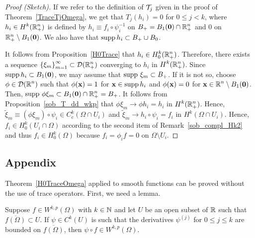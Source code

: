 \begin{proof}[Proof (Sketch)]
If we refer to the definition of $\mathcal{T}_j$ given in the proof of
Theorem~\ref{TraceTjOmega}, we get that
$\displaystyle T_j(h_i) = 0$ for $0 \leq j <k$, where
$\displaystyle h_i \in H^k(\mathbb{R}^n_+)$ is defined by
$h_i \equiv f_i \circ \psi_i^{-1}$ on
$\displaystyle B_+ = B_1(\mathbf{0}) \cap \mathbb{R}^n_+$
and $0$ on $\displaystyle \mathbb{R}^n_+ \setminus B_1(\mathbf{0})$.  We also have that
$\operatorname{supp} h_i \subset B_+ \cup B_0$.

It follows from Proposition~\ref{H0Trace} that
$\displaystyle h_i \in H^k_0(\mathbb{R}^n_+)$.
Therefore, there exists a sequence
$\displaystyle \left\{\xi_m\right\}_{m=1}^\infty \subset \mathcal{D}(\mathbb{R}^n_+)$
converging to $h_i$ in $\displaystyle H^k(\mathbb{R}^n_+)$.  Since
$\operatorname{supp} h_i \subset B_1(\mathbf{0})$, we may assume that
$\operatorname{supp}\, \xi_m \subset B_+$.  If it is not
so, choose $\displaystyle \phi \in \mathcal{D}(\mathbb{R}^n)$ such that
$\phi(\mathbf{x}) = 1$ for $\mathbf{x} \in \operatorname{supp} h_i$ and $\phi(\mathbf{x}) = 0$ for
$\displaystyle \mathbf{x} \in \mathbb{R}^n \setminus B_1(\mathbf{0})$.
Then,
$\displaystyle \operatorname{supp}\, \phi \xi_m \subset B_1(\mathbf{0}) \cap \mathbb{R}^n_+ = B_+$.
It follows from Proposition~\ref{sob_T_dd_wkp} that
$\phi \xi_m \to \phi h_i = h_i$ in $\displaystyle H^k(\mathbb{R}^n_+)$.
Hence, $\displaystyle \tilde{\xi}_m \equiv (\phi \xi_m) \circ
\psi_i \in C_c^k(\Omega \cap U_i)$
and $\tilde{\xi}_m \to h_i \circ \psi_i = f_i$
in $\displaystyle H^k(\Omega \cap U_i)$.
Hence, $\displaystyle f_i \in H^k_0(U_i \cap \Omega)$
according to the second item of Remark~\ref{sob_compl_Hk2}
and thus $\displaystyle f_i \in H^k_0(\Omega)$ because $f_i = \phi_i f = 0$ on
$\Omega \setminus U_i$.
\end{proof}

\subsection{Appendix}

Theorem~\ref{H0TraceOmega} applied to smooth functions can be proved
without the use of trace operators.  First, we need a lemma.

\begin{lemma} \label{sob_comp_DF}
Suppose $\displaystyle f \in W^{k,p}(\Omega)$ with $k\in \mathbb{N}$ and let
$U$ be an open subset of $\mathbb{R}$ such that
$\displaystyle \overline{ f(\Omega)} \subset U$.  If
$\psi \in C^k(U)$ is such that the derivatives $\displaystyle \psi^{(j)}$ for
$0\leq j \leq k$ are bounded on $\displaystyle \overline{ f(\Omega)}$,
then $\displaystyle \psi \circ f \in W^{k,p}(\Omega)$.
\end{lemma}

